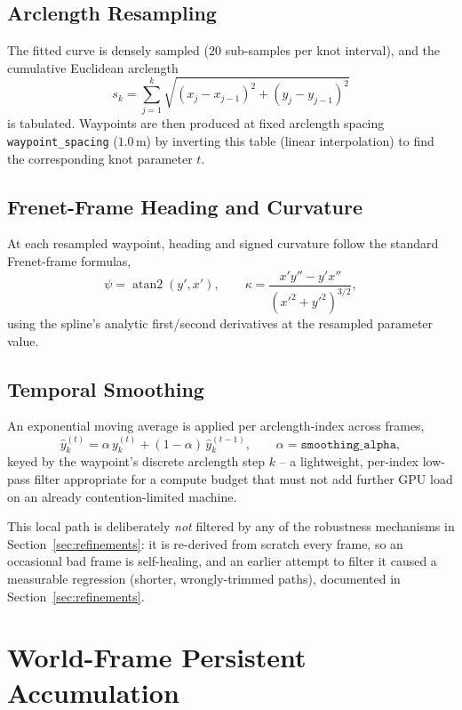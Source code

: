 \documentclass[11pt]{article}
\newcommand{\code}[1]{\texttt{#1}}
\begin{document}
\subsection{Arclength Resampling}
The fitted curve is densely sampled ($20$ sub-samples per knot interval), and the cumulative
Euclidean arclength
\begin{equation}
s_k = \sum_{j=1}^{k} \sqrt{(x_j - x_{j-1})^2 + (y_j - y_{j-1})^2}
\end{equation}
is tabulated. Waypoints are then produced at fixed arclength spacing \code{waypoint\_spacing}
($1.0\,\mathrm{m}$) by inverting this table (linear interpolation) to find the corresponding knot
parameter $t$.

\subsection{Frenet-Frame Heading and Curvature}
At each resampled waypoint, heading and signed curvature follow the standard Frenet-frame
formulas,
\begin{equation}
\psi = \operatorname{atan2}(y', x'), \qquad
\kappa = \frac{x'y'' - y'x''}{\left(x'^2+y'^2\right)^{3/2}},
\label{eq:curvature}
\end{equation}
using the spline's analytic first/second derivatives at the resampled parameter value.

\subsection{Temporal Smoothing}
An exponential moving average is applied per arclength-index across frames,
\begin{equation}
\hat{y}^{(t)}_k = \alpha\, y^{(t)}_k + (1-\alpha)\, \hat{y}^{(t-1)}_k, \qquad \alpha = \code{smoothing\_alpha},
\end{equation}
keyed by the waypoint's discrete arclength step $k$ -- a lightweight, per-index low-pass filter
appropriate for a compute budget that must not add further GPU load on an already
contention-limited machine.

This local path is deliberately \emph{not} filtered by any of the robustness mechanisms in
Section~\ref{sec:refinements}: it is re-derived from scratch every frame, so an occasional bad
frame is self-healing, and an earlier attempt to filter it caused a measurable regression (shorter,
wrongly-trimmed paths), documented in Section~\ref{sec:refinements}.

\section{World-Frame Persistent Accumulation}
\label{sec:world}
\end{document}
